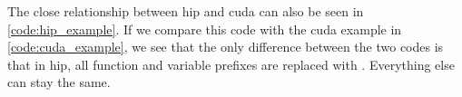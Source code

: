 The close relationship between \gls{hip} and \gls{cuda} can also be seen in \autoref{code:hip_example}. 
If we compare this code with the \gls{cuda} example in \autoref{code:cuda_example}, we see that the only difference between the two codes is that in \gls{hip}, all  function and variable prefixes are replaced with . 
Everything else can stay the same. 


